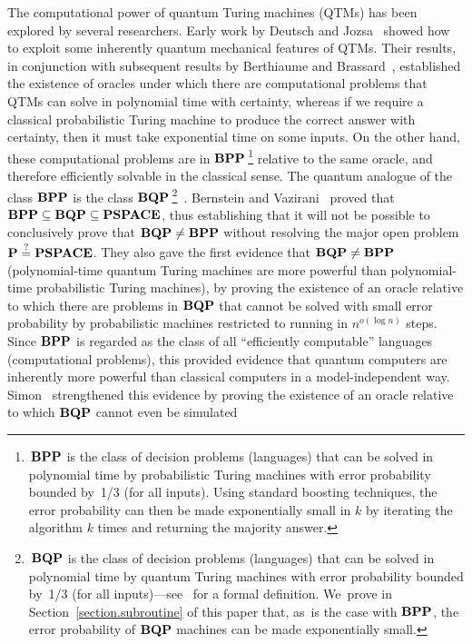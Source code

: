 The computational power of quantum Turing machines (QTMs) has been explored
by several researchers.  Early work by Deutsch and Jozsa~\cite{DJ} showed
how to exploit some inherently quantum mechanical features of QTMs.
Their results, in conjunction with subsequent results by
Berthiaume and Brassard~\cite{BB92,BB94}, established
the existence of oracles under which
there are computational problems that QTMs can solve
in polynomial time with certainty, whereas if we require a classical
probabilistic Turing machine to produce the correct answer with
certainty, then it must take exponential time on some inputs.
On the other hand, these computational problems
are in $\mbox{\bf BPP}$\,\footnote{\samepage\,$\mbox{\bf BPP}$ is the class of
decision problems (languages)
that can be solved in polynomial time by probabilistic Turing machines
with error probability bounded by~1/3 (for all inputs).  Using standard
boosting techniques, the error probability can then be made exponentially
small in $k$ by iterating the algorithm $k$ times and returning the majority
answer.} relative to the same oracle, and therefore efficiently
solvable in the classical sense.  The quantum analogue of the
class $\mbox{\bf BPP}$ is the class $\mbox{\bf BQP}$\,\footnote{\samepage\,$\mbox{\bf BQP}$ is the class of
decision problems (languages)
that can be solved in polynomial time by quantum Turing machines
with error probability bounded by~1/3 (for all inputs)---see~\cite{BV}
for a formal definition.
We~prove in Section~\ref{section.subroutine} of this paper that,
as~is the case with $\mbox{\bf BPP}$, the error probability of $\mbox{\bf BQP}$ machines
can be made exponentially small.}~\cite{BB92}.
Bernstein and Vazirani~\cite{BV} proved that
$\mbox{\bf BPP} \subseteq \mbox{\bf BQP} \subseteq \mbox{\bf PSPACE}$, thus establishing that it will
not be possible to conclusively prove that $\mbox{\bf BQP} \neq \mbox{\bf BPP}$ \mbox{without}
resolving the major open problem $\mbox{\bf P} \stackrel{?}{=} \mbox{\bf PSPACE}$.
They also gave the first evidence that $\mbox{\bf BQP} \neq \mbox{\bf BPP}$ (polynomial-time
quantum Turing machines are more powerful than polynomial-time probabilistic
Turing machines), by proving the existence of an oracle relative to which
there are problems in $\mbox{\bf BQP}$ that cannot be solved with small error
probability by probabilistic machines restricted to running in
$n^{o(\log n)}$ steps.
Since $\mbox{\bf BPP}$ is regarded as the class of all ``efficiently computable''
languages (computational problems), this provided evidence that quantum
computers are inherently more powerful than classical computers in a
model-independent way.  Simon~\cite{Si} strengthened this evidence by proving
the existence of an oracle relative to which $\mbox{\bf BQP}$ cannot even be simulated
